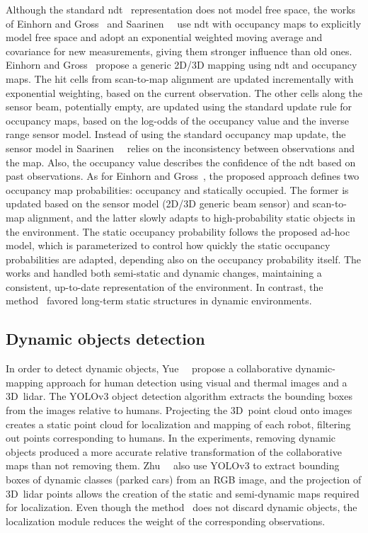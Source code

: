 Although the standard \gls{ndt}~\cite{biber-strasser:iros:2003} representation
does not model free space, the works of
Einhorn and Gross~\cite{einhorn-gross:ecmr:2013,einhorn-gross:ras:2015} and
Saarinen~\etal~\cite{saarinen:ijrr:2013} use \gls{ndt} with occupancy maps
to explicitly model free space and adopt
an exponential weighted moving average and covariance for new measurements,
giving them stronger influence than old ones.
Einhorn and Gross~\cite{einhorn-gross:ecmr:2013} propose
a generic 2D/3D mapping using \gls{ndt} and occupancy maps.
The hit cells from scan-to-map alignment are updated incrementally
with exponential weighting, based on the current observation.
The other cells along the sensor beam, potentially empty,
are updated using the standard update rule for occupancy maps, based on
the log-odds of the occupancy value and the inverse range sensor model.
Instead of using the standard occupancy map update,
the sensor model in Saarinen~\etal~\cite{saarinen:ijrr:2013} relies on
the inconsistency between observations and the map.
Also, the occupancy value describes the confidence of the \gls{ndt}
based on past observations.
As for Einhorn and Gross~\cite{einhorn-gross:ras:2015},
the proposed approach defines two occupancy map probabilities:
occupancy and statically occupied. The former is updated based on
the sensor model (2D/3D generic beam sensor) and scan-to-map alignment, and the
latter slowly adapts to high-probability static objects in the environment.
The static occupancy probability follows the proposed ad-hoc model,
which is parameterized to control how quickly the static occupancy
probabilities are adapted, depending also on the occupancy probability itself.
The works \cite{einhorn-gross:ecmr:2013} and \cite{einhorn-gross:ras:2015}
handled both semi-static and dynamic changes, maintaining a consistent,
up-to-date representation of the environment. In contrast,
the method~\cite{saarinen:ijrr:2013} favored
long-term static structures in dynamic environments.

\subsection{Dynamic objects detection}

In order to detect dynamic objects, Yue~\etal~\cite{yue:icra:2020}
propose a collaborative dynamic-mapping approach for human detection
using visual and thermal images and a 3D~\gls{lidar}.
The YOLOv3 object detection algorithm extracts the bounding boxes
from the images relative to humans.
Projecting the 3D~point cloud onto images creates a static point cloud
for localization and mapping of each robot,
filtering out points corresponding to humans.
In the experiments, removing dynamic objects produced a more accurate relative
transformation of the collaborative maps than not removing them.
Zhu~\etal~\cite{zhu:icra:2021} also use YOLOv3 to extract bounding boxes
of dynamic classes (parked cars) from an RGB image,
and the projection of 3D~\gls{lidar} points allows the creation of
the static and semi-dynamic maps required for localization.
Even though the method~\cite{zhu:icra:2021} does not discard dynamic objects,
the localization module reduces the weight of the corresponding observations.


